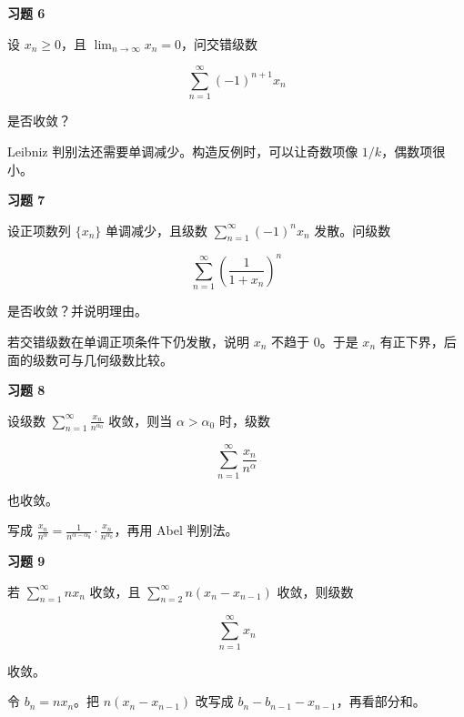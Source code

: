 \begin{exercisebox}
\textbf{习题 6 }

设 \(x_n\ge0\)，且 \(\lim_{n\to\infty}x_n=0\)，问交错级数

\[
      \sum_{n=1}^{\infty}(-1)^{n+1}x_n
      \]

是否收敛？

\begin{hintbox}
Leibniz 判别法还需要单调减少。构造反例时，可以让奇数项像 \(1/k\)，偶数项很小。
\end{hintbox}
\end{exercisebox}

\begin{exercisebox}
\textbf{习题 7 }

设正项数列 \(\{x_n\}\) 单调减少，且级数 \(\sum_{n=1}^{\infty}(-1)^nx_n\) 发散。问级数

\[
      \sum_{n=1}^{\infty}\left(\frac1{1+x_n}\right)^n
      \]

是否收敛？并说明理由。

\begin{hintbox}
若交错级数在单调正项条件下仍发散，说明 \(x_n\) 不趋于 \(0\)。于是 \(x_n\) 有正下界，后面的级数可与几何级数比较。
\end{hintbox}
\end{exercisebox}

\begin{exercisebox}
\textbf{习题 8 }

设级数 \(\sum_{n=1}^{\infty}\frac{x_n}{n^{\alpha_0}}\) 收敛，则当 \(\alpha>\alpha_0\) 时，级数

\[
      \sum_{n=1}^{\infty}\frac{x_n}{n^\alpha}
      \]

也收敛。

\begin{hintbox}
写成 \(\frac{x_n}{n^\alpha}=\frac1{n^{\alpha-\alpha_0}}\cdot\frac{x_n}{n^{\alpha_0}}\)，再用 Abel 判别法。
\end{hintbox}
\end{exercisebox}

\begin{exercisebox}
\textbf{习题 9 }

若 \(\sum_{n=1}^{\infty}nx_n\) 收敛，且 \(\sum_{n=2}^{\infty}n(x_n-x_{n-1})\) 收敛，则级数

\[
      \sum_{n=1}^{\infty}x_n
      \]

收敛。

\begin{hintbox}
令 \(b_n=nx_n\)。把 \(n(x_n-x_{n-1})\) 改写成 \(b_n-b_{n-1}-x_{n-1}\)，再看部分和。
\end{hintbox}
\end{exercisebox}

